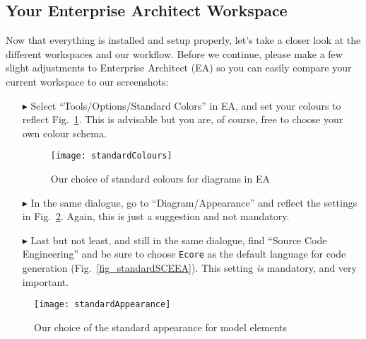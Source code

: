 \visHeader

\subsection{Your Enterprise Architect Workspace}

Now\hypertarget{projectStructure vis}{} that everything is installed and setup properly, let's take a closer look at the different workspaces and our workflow.
Before we continue, please make a few slight adjustments to Enterprise Architect (EA) so you can easily compare your current workspace to our screenshots:
\begin{itemize}

\item[$\blacktriangleright$] Select ``Tools/Options/Standard Colors'' in EA, and set your colours to reflect Fig.~\ref{fig_standardColoursEA}.
This is advisable but you are, of course, free to choose your own colour schema.

\vspace{0.5cm}

\begin{figure}[htbp]
  \centering
  \texttt{[image: standardColours]}
  \caption{Our choice of standard colours for diagrams in EA}
  \label{fig_standardColoursEA}
\end{figure}

\vspace{0.5cm}

\item[$\blacktriangleright$] In the same dialogue, go to ``Diagram/Appearance'' and reflect the settings in Fig.~\ref{fig_standardAppearanceEA}.
Again, this is just a suggestion and not mandatory.

\vspace{0.5cm}

\item[$\blacktriangleright$] Last but not least, and still in the same dialogue, find ``Source Code Engineering'' and be sure to choose \texttt{Ecore} as the
default language for code generation (Fig.~\ref{fig_standardSCEEA}). This setting \emph{is} mandatory, and very important.
\end{itemize}

\begin{figure}[htbp]
  \centering
  \texttt{[image: standardAppearance]}
  \caption{Our choice of the standard appearance for model elements}
  \label{fig_standardAppearanceEA}
\end{figure}

